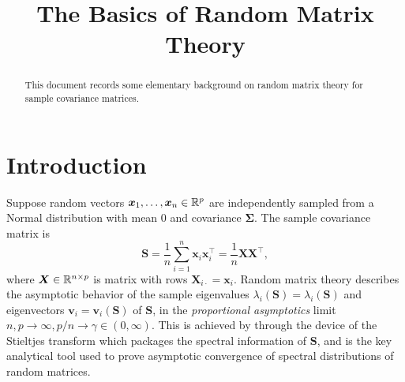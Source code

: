 \documentclass{article}
\title{ {\bf The Basics of Random Matrix Theory} }
\newcommand{\bx}{\boldsymbol{x}}
\newcommand{\bv}{\boldsymbol{v}}
\newcommand{\bX}{\boldsymbol{X}}
\newcommand{\bSigma}{\boldsymbol{\Sigma}}
\newcommand{\bS}{\boldsymbol{S}}
\begin{document}
	
\maketitle
\RaggedRight

\begin{abstract}
	This document records some elementary background on random matrix theory for sample covariance matrices.
\end{abstract}

\section{Introduction}

Suppose random vectors $\bx_1,\ldots,\bx_n \in \Reals^p$ are independently sampled from a Normal distribution with mean $0$ and covariance $\bSigma$. The sample covariance matrix is
$$
\bS = \frac{1}{n}\sum_{i = 1}^{n} \bx_i \bx_i^{\top} = \frac{1}{n}\bX \bX^{\top},
$$ 
where $\bX \in \Reals^{n \times p}$ is matrix with rows $\bX_{i\cdot} = \bx_i$. Random matrix theory describes the asymptotic behavior of the sample eigenvalues $\lambda_i(\bS) = \lambda_i(\bS)$ and eigenvectors $\bv_i = \bv_i(\bS)$ of $\bS$, in the \emph{proportional asymptotics} limit $n,p \to \infty, p/n \to \gamma \in (0,\infty)$. This is achieved by through the device of the Stieltjes transform which packages the spectral information of $\bS$, and is the key analytical tool used to prove asymptotic convergence of spectral distributions of random matrices.
\end{document}

